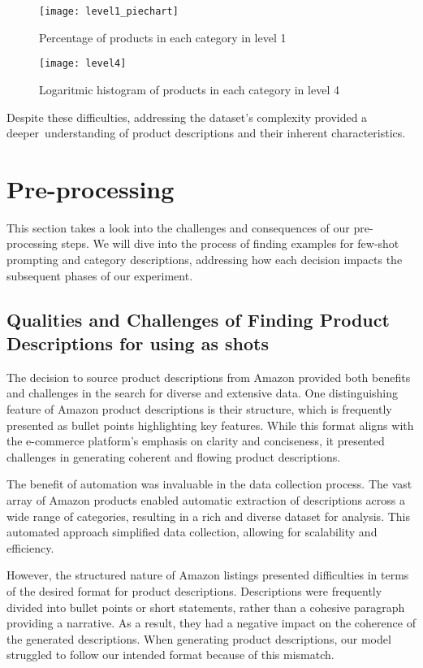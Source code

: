 \begin{figure}[H]
	\centering
	\texttt{[image: level1\_piechart]}
	\caption{Percentage of products in each category in level 1}
	\label{fig:level1}
\end{figure}

\begin{figure}[H]
	\centering
	\texttt{[image: level4]}
	\caption{Logaritmic histogram of products in each category in level 4}
	\label{fig:level4}
\end{figure}

Despite these difficulties, addressing the dataset's complexity provided a deeper understanding of product descriptions and their inherent characteristics. 



\section{Pre-processing}

This section takes a look into the challenges and consequences of our pre-processing steps. We will dive into the process of finding examples for few-shot prompting and category descriptions, addressing how each decision impacts the subsequent phases of our experiment.


\subsection{Qualities and Challenges of Finding Product Descriptions for using as shots}

The decision to source product descriptions from Amazon provided both benefits and challenges in the search for diverse and extensive data. One distinguishing feature of Amazon product descriptions is their structure, which is frequently presented as bullet points highlighting key features. While this format aligns with the e-commerce platform's emphasis on clarity and conciseness, it presented challenges in generating coherent and flowing product descriptions. \cite{Team_2023}

The benefit of automation was invaluable in the data collection process. The vast array of Amazon products enabled automatic extraction of descriptions across a wide range of categories, resulting in a rich and diverse dataset for analysis. This automated approach simplified data collection, allowing for scalability and efficiency.

However, the structured nature of Amazon listings presented difficulties in terms of the desired format for product descriptions. Descriptions were frequently divided into bullet points or short statements, rather than a cohesive paragraph providing a narrative.  As a result, they had a negative impact on the coherence of the generated descriptions. When generating product descriptions, our model struggled to follow our intended format because of this mismatch.


